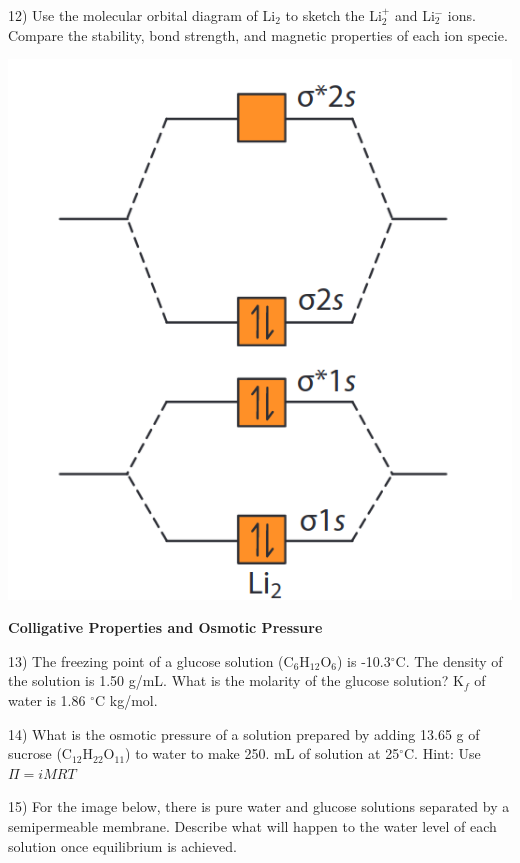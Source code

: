 \documentclass[12pt]{article}
\begin{document}
12) Use the molecular orbital diagram of Li$_2$ to sketch the Li$_2^+$ and
Li$_2^-$ ions. Compare the stability, bond strength, and magnetic properties
of each ion specie.

\begin{center}
  \includegraphics[scale=0.3]{li_mo}
\end{center}

\newpage

\textbf{Colligative Properties and Osmotic Pressure}

13) The freezing point of a glucose solution (C$_6$H$_{12}$O$_6$) is -10.3$^\circ$C.
The density of the solution is 1.50 g/mL. What is the molarity of the glucose solution?
K$_f$ of water is 1.86 $^\circ$C kg/mol.

\vspace{2in}

14) What is the osmotic pressure of a solution prepared by adding 13.65 g of
sucrose (C$_{12}$H$_{22}$O$_{11}$) to water to make 250. mL of solution at 25$^\circ$C.
Hint: Use $\Pi = iMRT$

\vspace{2in}

15) For the image below, there is pure water and glucose solutions separated by a
semipermeable membrane. Describe what will happen to the water level of each solution
once equilibrium is achieved.
\end{document}
